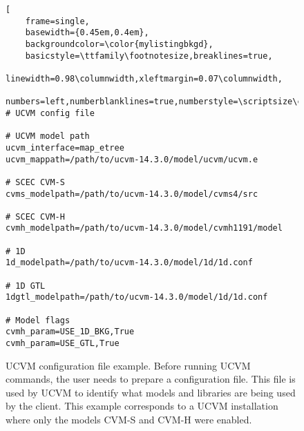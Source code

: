 
\begin{figure}[th]
\begin{lstlisting}[
	frame=single,
	basewidth={0.45em,0.4em},
	backgroundcolor=\color{mylistingbkgd},
	basicstyle=\ttfamily\footnotesize,breaklines=true,
	linewidth=0.98\columnwidth,xleftmargin=0.07\columnwidth,
	numbers=left,numberblanklines=true,numberstyle=\scriptsize\color{mylistingnclr}]
# UCVM config file

# UCVM model path
ucvm_interface=map_etree
ucvm_mappath=/path/to/ucvm-14.3.0/model/ucvm/ucvm.e

# SCEC CVM-S
cvms_modelpath=/path/to/ucvm-14.3.0/model/cvms4/src

# SCEC CVM-H
cvmh_modelpath=/path/to/ucvm-14.3.0/model/cvmh1191/model

# 1D
1d_modelpath=/path/to/ucvm-14.3.0/model/1d/1d.conf

# 1D GTL
1dgtl_modelpath=/path/to/ucvm-14.3.0/model/1d/1d.conf

# Model flags
cvmh_param=USE_1D_BKG,True
cvmh_param=USE_GTL,True
\end{lstlisting}
\caption{UCVM configuration file example. Before running UCVM commands, the user needs to prepare a configuration file. This file is used by UCVM to identify what models and libraries are being used by the client. This example corresponds to a UCVM installation where only the models CVM-S and CVM-H were enabled.}
\label{fig:ucvm-config}
\end{figure}
